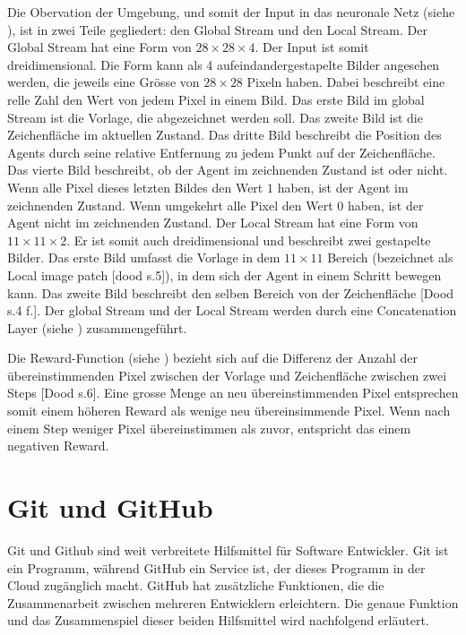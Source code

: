 Die Obervation der Umgebung, und somit der Input in das neuronale Netz (siehe
), ist in zwei Teile gegliedert: den Global Stream und
den Local Stream. Der Global Stream hat eine Form von $28\times28\times4$. Der
Input ist somit dreidimensional. Die Form kann als 4 aufeindandergestapelte
Bilder angesehen werden, die jeweils eine Grösse von $28\times28$ Pixeln haben.
Dabei beschreibt eine relle Zahl den Wert von jedem Pixel in einem Bild. Das
erste Bild im global Stream ist die Vorlage, die abgezeichnet werden soll. Das
zweite Bild ist die Zeichenfläche im aktuellen Zustand. Das dritte Bild
beschreibt die Position des Agents durch seine relative Entfernung zu jedem
Punkt auf der Zeichenfläche. Das vierte Bild beschreibt, ob der Agent im
zeichnenden Zustand ist oder nicht. Wenn alle Pixel dieses letzten Bildes den
Wert $1$ haben, ist der Agent im zeichnenden Zustand. Wenn umgekehrt alle Pixel
den Wert $0$ haben, ist der Agent nicht im zeichnenden Zustand. Der Local Stream
hat eine Form von $11\times11\times2$. Er ist somit auch dreidimensional und
beschreibt zwei gestapelte Bilder. Das erste Bild umfasst die Vorlage in dem
$11\times11$ Bereich (bezeichnet als Local image patch [dood s.5]), in dem sich
der Agent in einem Schritt bewegen kann. Das zweite Bild beschreibt den selben
Bereich von der Zeichenfläche [Dood s.4 f.]. Der global Stream und der Local
Stream werden durch eine Concatenation Layer (siehe )
zusammengeführt.

Die Reward-Function (siehe ) bezieht sich auf die
Differenz der Anzahl der übereinstimmenden Pixel zwischen der Vorlage und
Zeichenfläche zwischen zwei Steps [Dood s.6]. Eine grosse Menge an neu
übereinstimmenden Pixel entsprechen somit einem höheren Reward als wenige neu
übereinsimmende Pixel. Wenn nach einem Step weniger Pixel übereinstimmen als
zuvor, entspricht das einem negativen Reward. 

\section{Git und GitHub}\label{chap:t_git} Git und Github sind weit verbreitete
Hilfsmittel für Software Entwickler. Git ist ein Programm, während GitHub ein
Service ist, der dieses Programm in der Cloud zugänglich macht. GitHub hat
zusätzliche Funktionen, die die Zusammenarbeit zwischen mehreren Entwicklern
erleichtern. Die genaue Funktion und das Zusammenspiel dieser beiden Hilfsmittel
wird nachfolgend erläutert.

